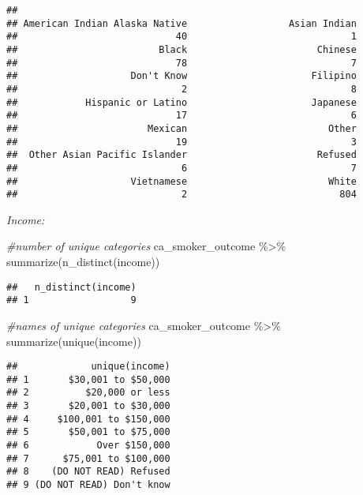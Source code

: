 \documentclass[
]{article}
\newenvironment{Shaded}{\begin{snugshade}}{\end{snugshade}}
\newcommand{\CommentTok}[1]{\textcolor[rgb]{0.56,0.35,0.01}{\textit{#1}}}
\newcommand{\FunctionTok}[1]{\textcolor[rgb]{0.00,0.00,0.00}{#1}}
\newcommand{\NormalTok}[1]{#1}
\newcommand{\SpecialCharTok}[1]{\textcolor[rgb]{0.00,0.00,0.00}{#1}}
\begin{document}
\begin{verbatim}
## 
## American Indian Alaska Native                  Asian Indian 
##                            40                             1 
##                         Black                       Chinese 
##                            78                             7 
##                    Don't Know                      Filipino 
##                             2                             8 
##            Hispanic or Latino                      Japanese 
##                            17                             6 
##                       Mexican                         Other 
##                            19                             3 
##  Other Asian Pacific Islander                       Refused 
##                             6                             7 
##                    Vietnamese                         White 
##                             2                           804
\end{verbatim}

\emph{Income:}

\begin{Shaded}
\begin{Highlighting}[]
\CommentTok{\#number of unique categories }
\NormalTok{ca\_smoker\_outcome }\SpecialCharTok{\%\textgreater{}\%} \FunctionTok{summarize}\NormalTok{(}\FunctionTok{n\_distinct}\NormalTok{(income))}
\end{Highlighting}
\end{Shaded}

\begin{verbatim}
##   n_distinct(income)
## 1                  9
\end{verbatim}

\begin{Shaded}
\begin{Highlighting}[]
\CommentTok{\#names of unique categories }
\NormalTok{ca\_smoker\_outcome }\SpecialCharTok{\%\textgreater{}\%} \FunctionTok{summarize}\NormalTok{(}\FunctionTok{unique}\NormalTok{(income))}
\end{Highlighting}
\end{Shaded}

\begin{verbatim}
##             unique(income)
## 1       $30,001 to $50,000
## 2          $20,000 or less
## 3       $20,001 to $30,000
## 4     $100,001 to $150,000
## 5       $50,001 to $75,000
## 6            Over $150,000
## 7      $75,001 to $100,000
## 8    (DO NOT READ) Refused
## 9 (DO NOT READ) Don't know
\end{verbatim}
\end{document}

